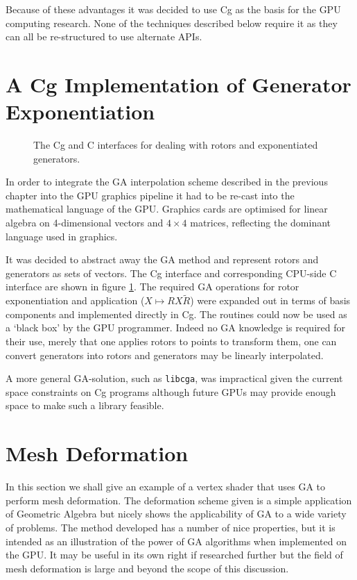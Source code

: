 Because of these advantages it was decided to use Cg as the basis for the GPU
computing research. None of the techniques described below require it as they
can all be re-structured to use alternate APIs.

\section{A Cg Implementation of Generator Exponentiation}

\begin{figure}[p]
\centering
{}
\caption{\label{fig:rotortools}The Cg and C interfaces for dealing with rotors and
  exponentiated generators.}
\end{figure}

In order to integrate the GA interpolation scheme described in the previous 
chapter into the GPU graphics pipeline it had to be re-cast into the 
mathematical language of the GPU. Graphics cards are optimised for 
linear algebra on 4-dimensional vectors and $4\times4$ matrices, reflecting
the dominant language used in graphics. 

It was decided to abstract away the GA method and represent rotors and
generators as sets of vectors. The Cg interface and corresponding CPU-side C
interface are shown in figure \ref{fig:rotortools}. The required GA
operations for rotor exponentiation and application ($X \mapsto RX\tilde{R}$)
were expanded out in terms of basis components and implemented
directly in Cg. The routines could now be used as a `black box' by the GPU 
programmer. Indeed no GA knowledge is required for their use, merely that one
applies rotors to points to transform them, one can convert generators into
rotors and generators may be linearly interpolated.

A more general GA-solution, such as {\tt libcga}, was impractical given the
current space constraints on Cg programs although future GPUs may provide
enough space to make such a library feasible.

\section{Mesh Deformation}

In this section we shall give an example of a vertex shader that uses GA to
perform mesh deformation. The deformation scheme given is a
simple application of Geometric Algebra but nicely shows the applicability of
GA to a wide variety of problems. The method developed has a number of nice
properties, but it is intended as an illustration of the power of GA algorithms when
implemented on the GPU. It may be useful in its own right if researched
further but the field of mesh deformation is large and beyond the scope of
this discussion.

